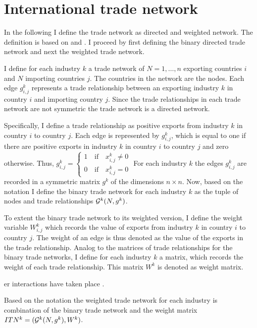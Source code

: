 \section{International trade network}
In the following I define the trade network as directed and weighted network.
 The definition is based on \textcite{jackson2010} and \textcite{de2010}. I proceed by first defining the binary directed trade network and next the weighted trade network.\par
I define for each industry $k$ a trade network of $N = 1, \dots , n$ exporting countries $i$  and $N$ importing countries $j$.
The countries in the network are the nodes.
Each edge $g_{i,j}^k $ represents a trade relationship between an exporting industry $k$ in country $i$ and importing country $j$.
Since the trade relationships in each trade network are not symmetric the trade network is a directed network.
 \par
Specifically, I define a trade relationship as positive exports from industry $k$ in country $i$ to country $j$.
Each edge is represented by $g_{i,j}^k$, which is equal to one if there are positive exports in industry $k$ in country $i$ to country $j$ and zero otherwise.
Thus,
$g_{i,j}^k = \begin{cases}
 1 \quad \text{if} \quad x_{i,j}^k \neq 0 \\
0 \quad \text{if} \quad x_{i,j}^k = 0 \end{cases} $
For each industry $k$ the edges $g_{i,j}^k$ are recorded in a symmetric matrix  $g^k$  of the dimensions $n \times n$.
Now, based on the notation I define the binary trade network for each industry $k$ as the tuple of nodes and trade relationships $\mathcal{G}^k(N, g^k)$. \par
To extent the binary trade network to its weighted version, I define the
weight variable $W_{i,j}^k$ which records the value of exports from industry $k$  in country $i$ to country $j$.
The weight of an edge  is thus denoted as the value of the exports in the trade relationship.
Analog to the matrices of trade relationships for the binary trade networks, I define for each industry $k$ a matrix, which records the weight of each trade relationship.
  This matrix $W^k$ is denoted as weight matrix. %


er interactions have taken place \parencite{de2010}. \par
Based on the notation the weighted trade network for each industry is combination of the binary trade network and the weight matrix  $ITN^k =( \mathcal{G}^k(N, g^k),W^k)$.
